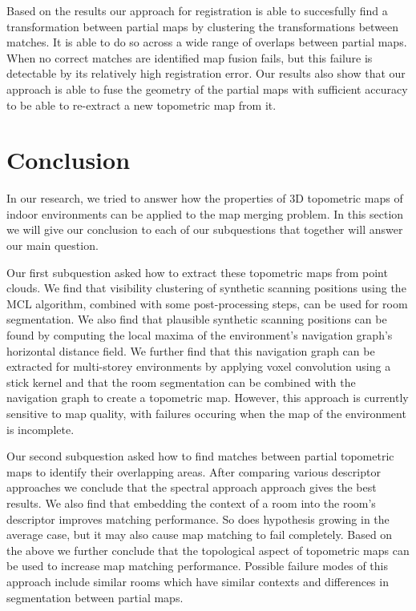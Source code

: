 Based on the results our approach for registration is able to succesfully find a transformation between partial maps by clustering the transformations between matches. It is able to do so across a wide range of overlaps between partial maps. When no correct matches are identified map fusion fails, but this failure is detectable by its relatively high registration error. Our results also show that our approach is able to fuse the geometry of the partial maps with sufficient accuracy to be able to re-extract a new topometric map from it. 

\pagebreak

\section{Conclusion}
In our research, we tried to answer how the properties of 3D topometric maps of indoor environments can be applied to the map merging problem. In this section we will give our conclusion to each of our subquestions that together will answer our main question.

Our first subquestion asked how to extract these topometric maps from point clouds. We find that visibility clustering of synthetic scanning positions using the MCL algorithm, combined with some post-processing steps, can be used for room segmentation. We also find that plausible synthetic scanning positions can be found by computing the local maxima of the environment's navigation graph's horizontal distance field. We further find that this navigation graph can be extracted for multi-storey environments by applying voxel convolution using a stick kernel and that the room segmentation can be combined with the navigation graph to create a topometric map. However, this approach is currently sensitive to map quality, with failures occuring when the map of the environment is incomplete.

Our second subquestion asked how to find matches between partial topometric maps to identify their overlapping areas. After comparing various descriptor approaches we conclude that the spectral approach approach gives the best results. We also find that embedding the context of a room into the room's descriptor improves matching performance. So does hypothesis growing in the average case, but it may also cause map matching to fail completely. Based on the above we further conclude that the topological aspect of topometric maps can be used to increase map matching performance. Possible failure modes of this approach include similar rooms which have similar contexts and differences in segmentation between partial maps.

